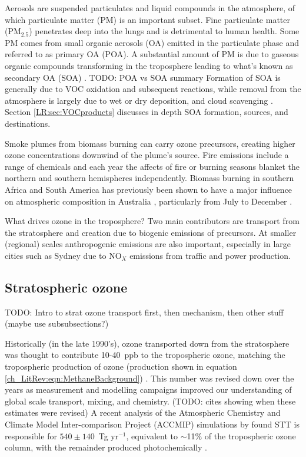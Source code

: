 	    Aerosols are suspended particulates and liquid compounds in the atmosphere, of which particulate matter (PM) is an important subset.
	    Fine particulate matter (PM$_{2.5}$) penetrates deep into the lungs and is detrimental to human health.
	    Some PM comes from small organic aerosols (OA) emitted in the particulate phase and referred to as primary OA (POA).
	    A substantial amount of PM is due to gaseous organic compounds transforming in the troposphere leading to what's known as secondary OA (SOA) \citep{Kroll2008}.
	    TODO: POA vs SOA summary
	    Formation of SOA is generally due to VOC oxidation and subsequent reactions, while removal from the atmosphere is largely due to wet or dry deposition, and cloud scavenging \citep{Kanakidou2005}.
	    Section \ref{LR:sec:VOCproducts} discusses in depth SOA formation, sources, and destinations.
	    
      Smoke plumes from biomass burning can carry ozone precursors, creating higher ozone concentrations downwind of the plume's source.
      Fire emissions include a range of chemicals and each year the affects of fire or burning seasons blanket the northern and southern hemispheres independently.
      Biomass burning in southern Africa and South America has previously been shown to have a major influence on atmospheric composition in Australia \citep{Oltmans2001, Gloudemans2006, Edwards2006}, particularly from July to December \citep{Pak2003, Liu2016}.
      
      What drives ozone in the troposphere? Two main contributors are transport from the stratosphere and creation due to biogenic emissions of precursors. 
      At smaller (regional) scales anthropogenic emissions are also important, especially in large cities such as Sydney due to NO$_X$ emissions from traffic and power production.
  \subsection{Stratospheric ozone}
    
    TODO: Intro to strat ozone transport first, then mechanism, then other stuff (maybe use subsubsections?)
    
    Historically (in the late 1990's), ozone transported down from the stratosphere was thought to contribute 10-40~ppb to the tropospheric ozone,  matching the tropospheric production of ozone (production shown in equation \ref{ch_LitRev:eqn:MethaneBackground}) \citep{Atkinson2000,Stohl2003}.
    This number was revised down over the years as measurement and modelling campaigns improved our understanding of global scale transport, mixing, and chemistry. (TODO: cites showing when these estimates were revised)
    A recent analysis of the Atmospheric Chemistry and Climate Model Inter-comparison Project (ACCMIP) simulations by \citet{Young2013} found STT is responsible for $540\pm140$~Tg yr$^{-1}$, equivalent to $\sim$11\% of the tropospheric ozone column, with the remainder produced photochemically \citep{Monks2015}.
    
